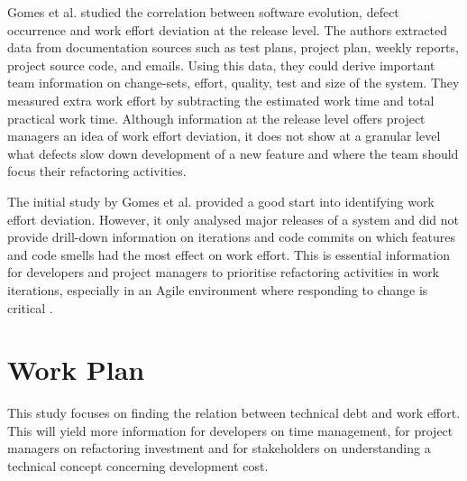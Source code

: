 Gomes et al. \cite{Gomes2011} studied the correlation between software
evolution, defect occurrence and work effort deviation at the release level. The
authors extracted data from documentation sources such as test plans, project
plan, weekly reports, project source code, and emails. Using this data, they
could derive important team information on change-sets, effort, quality, test and
size of the system. They measured extra work effort by subtracting the estimated
work time and total practical work time. Although information at the release
level offers project managers an idea of work effort deviation, it does not show
at a granular level what defects slow down development of a new feature and
where the team should focus their refactoring activities.

The initial study by Gomes et al. \cite{Gomes2011} provided a good start into
identifying work effort deviation. However, it only analysed major releases of a
system and did not provide drill-down information on iterations and code commits
on which features and code smells had the most effect on work effort. This is
essential information for developers and project managers to prioritise
refactoring activities in work iterations, especially in an Agile environment
where responding to change is critical \cite{agile-manifesto}.

\section{Work Plan}
\label{work-plan}

This study focuses on finding the relation between technical debt and work
effort. This will yield more information for developers on time management, for
project managers on refactoring investment and for stakeholders on understanding
a technical concept concerning development cost.

